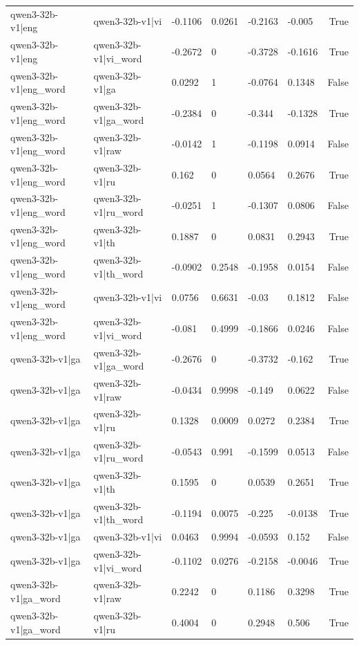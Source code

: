 \begin{table}
\begin{tabular}{llllllr}
qwen3-32b-v1|eng & qwen3-32b-v1|vi & -0.1106 & 0.0261 & -0.2163 & -0.005 & True \\
qwen3-32b-v1|eng & qwen3-32b-v1|vi_word & -0.2672 & 0 & -0.3728 & -0.1616 & True \\
qwen3-32b-v1|eng_word & qwen3-32b-v1|ga & 0.0292 & 1 & -0.0764 & 0.1348 & False \\
qwen3-32b-v1|eng_word & qwen3-32b-v1|ga_word & -0.2384 & 0 & -0.344 & -0.1328 & True \\
qwen3-32b-v1|eng_word & qwen3-32b-v1|raw & -0.0142 & 1 & -0.1198 & 0.0914 & False \\
qwen3-32b-v1|eng_word & qwen3-32b-v1|ru & 0.162 & 0 & 0.0564 & 0.2676 & True \\
qwen3-32b-v1|eng_word & qwen3-32b-v1|ru_word & -0.0251 & 1 & -0.1307 & 0.0806 & False \\
qwen3-32b-v1|eng_word & qwen3-32b-v1|th & 0.1887 & 0 & 0.0831 & 0.2943 & True \\
qwen3-32b-v1|eng_word & qwen3-32b-v1|th_word & -0.0902 & 0.2548 & -0.1958 & 0.0154 & False \\
qwen3-32b-v1|eng_word & qwen3-32b-v1|vi & 0.0756 & 0.6631 & -0.03 & 0.1812 & False \\
qwen3-32b-v1|eng_word & qwen3-32b-v1|vi_word & -0.081 & 0.4999 & -0.1866 & 0.0246 & False \\
qwen3-32b-v1|ga & qwen3-32b-v1|ga_word & -0.2676 & 0 & -0.3732 & -0.162 & True \\
qwen3-32b-v1|ga & qwen3-32b-v1|raw & -0.0434 & 0.9998 & -0.149 & 0.0622 & False \\
qwen3-32b-v1|ga & qwen3-32b-v1|ru & 0.1328 & 0.0009 & 0.0272 & 0.2384 & True \\
qwen3-32b-v1|ga & qwen3-32b-v1|ru_word & -0.0543 & 0.991 & -0.1599 & 0.0513 & False \\
qwen3-32b-v1|ga & qwen3-32b-v1|th & 0.1595 & 0 & 0.0539 & 0.2651 & True \\
qwen3-32b-v1|ga & qwen3-32b-v1|th_word & -0.1194 & 0.0075 & -0.225 & -0.0138 & True \\
qwen3-32b-v1|ga & qwen3-32b-v1|vi & 0.0463 & 0.9994 & -0.0593 & 0.152 & False \\
qwen3-32b-v1|ga & qwen3-32b-v1|vi_word & -0.1102 & 0.0276 & -0.2158 & -0.0046 & True \\
qwen3-32b-v1|ga_word & qwen3-32b-v1|raw & 0.2242 & 0 & 0.1186 & 0.3298 & True \\
qwen3-32b-v1|ga_word & qwen3-32b-v1|ru & 0.4004 & 0 & 0.2948 & 0.506 & True \\

\end{tabular}
\end{table}
